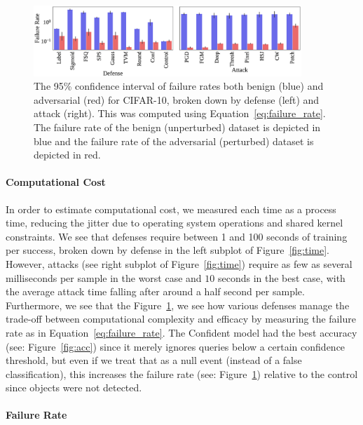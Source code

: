 \documentclass[journal]{IEEEtran}
\begin{document}
\begin{figure}[!hptb]
    {\centering
    \includegraphics[width=0.9\textwidth]{Fig14.eps}
    \vspace{-1em}
    \caption{The 95\% confidence interval of failure rates both benign (blue) and adversarial (red) for CIFAR-10, broken down by defense (left) and attack (right). This was computed using Equation~\ref{eq:failure_rate}. The failure rate of the benign (unperturbed) dataset is depicted in blue and the failure rate of the adversarial (perturbed) dataset is depicted in red.}
    \label{fig:failure_rate}
    } %
\end{figure}

\paragraph{Computational Cost}

 In order to estimate computational cost, we measured each time as a process time, reducing the jitter due to operating system operations and shared kernel constraints. We see that defenses require between 1 and 100 seconds of training per success, broken down by defense in the left subplot of Figure~\ref{fig:time}. However, attacks (see right subplot of Figure~\ref{fig:time}) require as few as several milliseconds per sample in the worst case and $10$ seconds in the best case, with the average attack time falling after around a half second per sample. Furthermore, we see that the  Figure~\ref{fig:failure_rate}, we see how various defenses manage the trade-off between computational complexity and efficacy by measuring the failure rate as in Equation~\ref{eq:failure_rate}. The Confident model had the best accuracy (see: Figure~\ref{fig:acc}) since it merely ignores queries below a certain confidence threshold, but even if we treat that as a null event (instead of a false classification), this increases the failure rate (see: Figure~\ref{fig:failure_rate}) relative to the control since objects were not detected.
 

\paragraph{Failure Rate}
\end{document}
